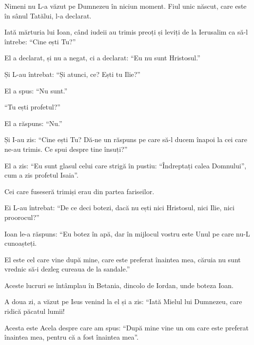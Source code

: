 {Nimeni nu L-a văzut pe Dumnezeu în niciun moment. Fiul unic născut, care este în sânul Tatălui, l-a declarat.


\par }{\PP {}Iată mărturia lui Ioan, când iudeii au trimis preoți și leviți de la Ierusalim ca să-l întrebe: “Cine ești Tu?”


\par }{\PP {}El a declarat, și nu a negat, ci a declarat: “Eu nu sunt Hristosul.”


\par }{\PP {}Și L-au întrebat: “Și atunci, ce? Ești tu Ilie?”

\par }{\PP El a spus: “Nu sunt.”

\par }{\PP “Tu ești profetul?”

\par }{\PP El a răspuns: “Nu.”


\par }{\PP {}Și I-au zis: “Cine ești Tu? Dă-ne un răspuns pe care să-l ducem înapoi la cei care ne-au trimis. Ce spui despre tine însuți?”


\par }{\PP {}El a zis: “Eu sunt glasul celui care strigă în pustiu: “Îndreptați calea Domnului”, cum a zis profetul Isaia”.


\par }{\PP {}Cei care fuseseră trimiși erau din partea fariseilor.

Ei L-au întrebat: “De ce deci botezi, dacă nu ești nici Hristosul, nici Ilie, nici proorocul?”


\par }{\PP {}Ioan le-a răspuns: “Eu botez în apă, dar în mijlocul vostru este Unul pe care nu-L cunoașteți.

El este cel care vine după mine, care este preferat înaintea mea, căruia nu sunt vrednic să-i dezleg cureaua de la sandale.”

Aceste lucruri se întâmplau în Betania, dincolo de Iordan, unde boteza Ioan.


\par }{\PP {}A doua zi, a văzut pe Isus venind la el și a zis: “Iată Mielul lui Dumnezeu, care ridică păcatul lumii!

Acesta este Acela despre care am spus: “După mine vine un om care este preferat înaintea mea, pentru că a fost înaintea mea”.

}
